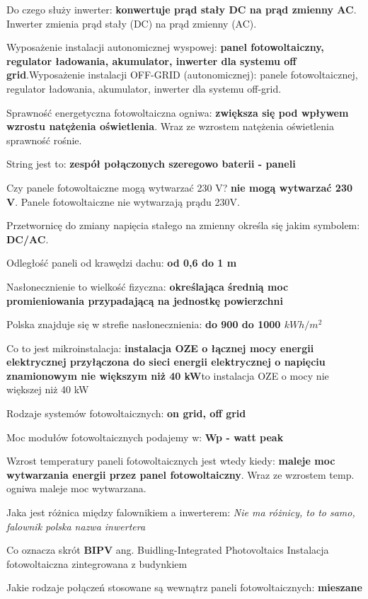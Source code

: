 \documentclass[12pt,a4paper]{article}
\begin{document}
Do czego służy inwerter: \textbf{konwertuje prąd stały DC na prąd zmienny AC}. Inwerter zmienia prąd stały (DC) na prąd zmienny (AC).

Wyposażenie instalacji  autonomicznej wyspowej: \textbf{panel fotowoltaiczny, regulator ładowania, akumulator, inwerter dla systemu off grid}.Wyposażenie instalacji OFF-GRID (autonomicznej): panele fotowoltaicznej, regulator ładowania, akumulator, inwerter dla systemu off-grid.

Sprawność energetyczna fotowoltaiczna ogniwa: \textbf{zwiększa się pod wpływem wzrostu natężenia oświetlenia}. Wraz ze wzrostem natężenia oświetlenia sprawność rośnie.

String jest to: \textbf{zespół połączonych szeregowo baterii - paneli}

Czy panele fotowoltaiczne mogą wytwarzać 230 V? \textbf{nie mogą wytwarzać 230 V}. Panele fotowoltaiczne nie wytwarzają prądu 230V.

Przetwornicę do zmiany napięcia stałego na zmienny określa się jakim symbolem: \textbf{DC/AC}. 

Odległość paneli od krawędzi dachu: \textbf{od 0,6 do 1 m}

Nasłonecznienie to wielkość fizyczna: \textbf{określająca średnią moc promieniowania przypadającą na jednostkę powierzchni}

Polska znajduje się w strefie nasłonecznienia: \textbf{do 900 do 1000 ${kWh/m^{2}}$}

Co to jest mikroinstalacja: \textbf{instalacja OZE o łącznej mocy energii elektrycznej przyłączona do sieci energii elektrycznej o napięciu znamionowym nie większym niż 40 kW}to instalacja OZE o mocy nie większej niż 40 kW

Rodzaje systemów fotowoltaicznych: \textbf{on grid, off grid}

Moc modułów fotowoltaicznych podajemy w: \textbf{Wp - watt peak}

Wzrost temperatury paneli fotowoltaicznych jest wtedy kiedy:
\textbf{maleje moc wytwarzania energii przez panel fotowoltaiczny}. Wraz ze wzrostem temp. ogniwa maleje moc wytwarzana.

Jaka jest różnica między falownikiem a inwerterem:
\textit{Nie ma różnicy, to to samo, falownik polska nazwa inwertera}

Co oznacza skrót \textbf{BIPV} ang. Buidling-Integrated Photovoltaics
Instalacja fotowoltaiczna zintegrowana z budynkiem

Jakie rodzaje połączeń stosowane są wewnątrz paneli fotowoltaicznych: \textbf{mieszane}
\end{document}
